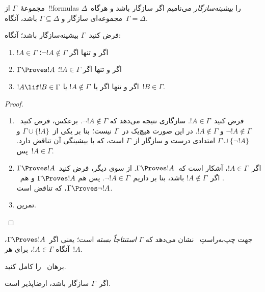 \documentclass[../../../include/open-logic-section]{subfiles}
\begin{document}


\begin{defn}
مجموعهٔ~$\Gamma$ از~!!{formula}s را \emph{بیشینه‌سازگار} می‌نامیم اگر
سازگار باشد و هرگاه~$\Delta$ مجموعه‌ای سازگار و
$\Gamma\subseteq\Delta$ باشد، آنگاه~$\Gamma=\Delta$.
\end{defn}

\begin{lem}[لم صدق]
فرض کنید~$\Gamma$ بیشینه‌سازگار باشد؛ آنگاه:
\begin{enumerate}
\item {} $!A\in\Gamma$ اگر و تنها اگر
  $\lnot !A\notin\Gamma$؛
\item {} $\Gamma\Proves !A$ اگر و تنها اگر
  $!A\in\Gamma$؛
\item {} $!A\lif !B\in\Gamma$ اگر و تنها اگر
  یا~$!A\notin\Gamma$ یا~$!B\in\Gamma$.
\end{enumerate}
\end{lem}

\begin{proof}
\begin{enumerate}
\item فرض کنید~$!A\in\Gamma$. سازگاری نتیجه می‌دهد که
  $\lnot !A\notin\Gamma$. برعکس، فرض کنید~$\lnot !A\notin\Gamma$ و
  $!A\notin\Gamma$. در این صورت هیچ‌یک در~$\Gamma$ نیست؛ بنا بر
   یکی از~$\Gamma\cup\{!A\}$ و
  $\Gamma\cup\{\lnot !A\}$ امتدادی درست و سازگار از~$\Gamma$ است، که
  با بیشینگی آن تناقض دارد. پس~$!A\in\Gamma$.
\item اگر~$!A\in\Gamma$، آشکار است که~$\Gamma\Proves !A$. از سوی
  دیگر، فرض کنید~$\Gamma\Proves !A$. اگر~$!A\notin\Gamma$ باشد، بنا بر
   داریم~$\lnot !A\in\Gamma$. پس هم
  $\Gamma\Proves !A$ و هم~$\Gamma\Proves\lnot !A$، که تناقض است.
\item تمرین.
\end{enumerate}
\end{proof}

جهت چپ‌به‌راستِ~ نشان می‌دهد که
$\Gamma$ \emph{استنتاجاً بسته} است؛ یعنی اگر~$\Gamma\Proves !A$، آنگاه
$!A\in\Gamma$، برای هر~$!A$.

\begin{prob}
  برهان~ را کامل کنید.
\end{prob}

\begin{thm}
اگر~$\Gamma$ سازگار باشد، ارضاپذیر است.
\end{thm}
\end{document}
